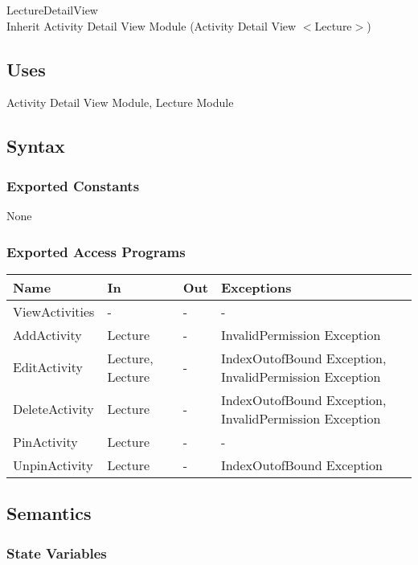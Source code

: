 \documentclass[12pt, titlepage]{article}
\begin{document}
LectureDetailView\\
Inherit Activity Detail View Module (Activity Detail View $<$Lecture$>$)
\subsection{Uses}

Activity Detail View Module, Lecture Module

\subsection{Syntax}

\subsubsection{Exported Constants}

None

\subsubsection{Exported Access Programs}
\begin{center}
\begin{tabular}{p{4cm} p{2cm} p{4cm} p{4cm}}
\hline
\textbf{Name} & \textbf{In} & \textbf{Out} & \textbf{Exceptions} \\
\hline
ViewActivities & - & - & - \\
AddActivity & Lecture & - & InvalidPermission Exception \\
EditActivity & Lecture, Lecture & - & IndexOutofBound Exception, InvalidPermission Exception \\
DeleteActivity & Lecture & - & IndexOutofBound Exception, InvalidPermission Exception \\
PinActivity & Lecture & - & - \\
UnpinActivity & Lecture & - & IndexOutofBound Exception \\
\hline
\end{tabular}
\end{center}

\subsection{Semantics}

\subsubsection{State Variables}
\end{document}
